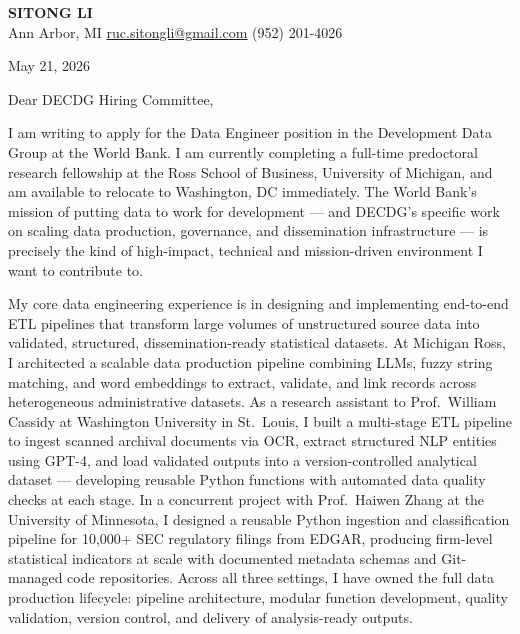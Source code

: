 \documentclass[12pt]{article}
\begin{document}
\begin{center}
  {\LARGE\textbf{\textcolor{accent}{SITONG LI}}} \\[4pt]
  \small Ann Arbor, MI
  \;\textbullet\;
  \href{mailto:ruc.sitongli@gmail.com}{ruc.sitongli@gmail.com}
  \;\textbullet\;
  (952) 201-4026
\end{center}

\vspace{1em}

\noindent May 21, 2026

\vspace{1em}

\noindent Dear DECDG Hiring Committee,

\vspace{1em}

I am writing to apply for the Data Engineer position in the Development Data Group at the World Bank. I am currently completing a full-time predoctoral research fellowship at the Ross School of Business, University of Michigan, and am available to relocate to Washington, DC immediately. The World Bank's mission of putting data to work for development --- and DECDG's specific work on scaling data production, governance, and dissemination infrastructure --- is precisely the kind of high-impact, technical and mission-driven environment I want to contribute to.

My core data engineering experience is in designing and implementing end-to-end ETL pipelines that transform large volumes of unstructured source data into validated, structured, dissemination-ready statistical datasets. At Michigan Ross, I architected a scalable data production pipeline combining LLMs, fuzzy string matching, and word embeddings to extract, validate, and link records across heterogeneous administrative datasets. As a research assistant to Prof.\ William Cassidy at Washington University in St.\ Louis, I built a multi-stage ETL pipeline to ingest scanned archival documents via OCR, extract structured NLP entities using GPT-4, and load validated outputs into a version-controlled analytical dataset --- developing reusable Python functions with automated data quality checks at each stage. In a concurrent project with Prof.\ Haiwen Zhang at the University of Minnesota, I designed a reusable Python ingestion and classification pipeline for 10,000+ SEC regulatory filings from EDGAR, producing firm-level statistical indicators at scale with documented metadata schemas and Git-managed code repositories. Across all three settings, I have owned the full data production lifecycle: pipeline architecture, modular function development, quality validation, version control, and delivery of analysis-ready outputs.
\end{document}
